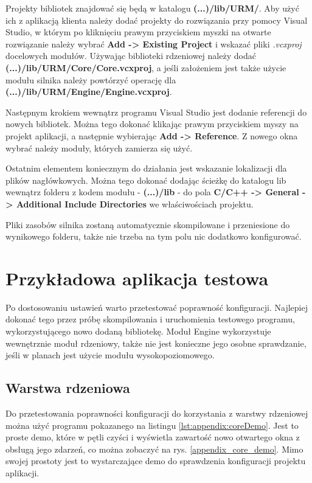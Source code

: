 Projekty bibliotek znajdować się będą w katalogu \textbf{(...)/lib/URM/}. Aby użyć ich z aplikacją klienta należy dodać projekty do rozwiązania przy pomocy Visual Studio, w którym po kliknięciu prawym przyciskiem myszki na otwarte rozwiązanie należy wybrać \textbf{Add -> Existing Project} i wskazać pliki \textit{.vcxproj} docelowych modułów. Używając biblioteki rdzeniowej należy dodać \textbf{(...)/lib/URM/Core/Core.vcxproj}, a jeśli założeniem jest także użycie modułu silnika należy powtórzyć operację dla \textbf{(...)/lib/URM/Engine/Engine.vcxproj}.

Następnym krokiem wewnątrz programu Visual Studio jest dodanie referencji do nowych bibliotek. Można tego dokonać klikając prawym przyciskiem myszy na projekt aplikacji, a następnie wybierając \textbf{Add -> Reference}. Z nowego okna wybrać należy moduły, których zamierza się użyć.

Ostatnim elementem koniecznym do działania jest wskazanie lokalizacji dla plików nagłówkowych. Można tego dokonać dodając ścieżkę do katalogu lib wewnątrz folderu z kodem modułu - \textbf{(...)/lib} - do pola \textbf{C/C++ -> General -> Additional Include Directories} we właściwościach projektu.

Pliki zasobów silnika zostaną automatycznie skompilowane i przeniesione do wynikowego folderu, także nie trzeba na tym polu nic dodatkowo konfigurować. 

\section*{Przykładowa aplikacja testowa}
Po dostosowaniu ustawień warto przetestować poprawność konfiguracji. Najlepiej dokonać tego przez próbę skompilowania i uruchomienia testowego programu, wykorzystującego nowo dodaną bibliotekę. Moduł Engine wykorzystuje wewnętrznie moduł rdzeniowy, także nie jest konieczne jego osobne sprawdzanie, jeśli w planach jest użycie modułu wysokopoziomowego. 

\subsection*{Warstwa rdzeniowa}
Do przetestowania poprawności konfiguracji do korzystania z warstwy rdzeniowej można użyć programu pokazanego na listingu \ref{lst:appendix:coreDemo}. Jest to proste demo, które w pętli czyści i wyświetla zawartość nowo otwartego okna z obsługą jego zdarzeń, co można zobaczyć na rys. \ref{appendix_core_demo}. Mimo swojej prostoty jest to wystarczające demo do sprawdzenia konfiguracji projektu aplikacji. 

